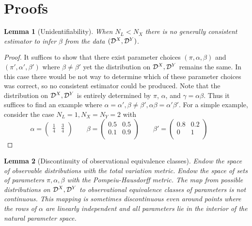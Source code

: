 \documentclass{article}
\newtheorem*{lemma*}{Lemma}
\theoremstyle{definition}
\begin{document}


\section{Proofs}
\label{sec:proofs}

\begin{lemma*}[Unidentifiability]  When $N_L<N_X$ there is no generally consistent estimator to infer $\beta$ from the data $(\mathcal{D}^X,\mathcal{D}^Y)$. 
\end{lemma*}

\begin{proof}
    It suffices to show that there exist parameter choices $(\pi,\alpha,\beta)$ and $(\pi',\alpha',\beta')$ where $\beta\neq\beta'$ yet the distribution on $\mathcal{D}^X,\mathcal{D}^Y$ remains the same.  In this case there would be not way to determine which of these parameter choices was correct, so no consistent estimator could be produced.  Note that the distribution on $\mathcal{D}^X,\mathcal{D}^Y$ is entirely determined by $\pi$, $\alpha$, and $\gamma=\alpha\beta$.  Thus it suffices to find an example where $\alpha=\alpha',\beta\neq\beta',\alpha\beta=\alpha'\beta'$.  For a simple example, consider the case $N_L=1,N_X=N_Y=2$ with
    \[
    \alpha=\left(
        \begin{array}{cc}
        \frac{1}{4} & \frac{3}{4}\\
        \end{array}
    \right) \qquad
    \beta=\left(
        \begin{array}{cc}
        0.5 & 0.5\\
        0.1 & 0.9\\
        \end{array}
    \right) \qquad
    \beta'=\left(
        \begin{array}{cc}
        0.8 & 0.2\\
        0 & 1\\
        \end{array}
    \right) \qquad
    \]
\end{proof}

\begin{lemma*}[Discontinuity of observational equivalence classes]  Endow the space of observable distributions with the total variation metric.  Endow the space of sets of parameters $\pi,\alpha,\beta$ with the Pompeiu-Hausdorff metric.  The map from possible distributions on $\mathcal{D}^X,\mathcal{D}^Y$ to observational equivalence classes of parameters is not continuous.   This mapping is sometimes discontinuous even around points where the rows of $\alpha$ are linearly independent and all parameters lie in the interior of the natural parameter space.  
\end{lemma*}
\end{document}
